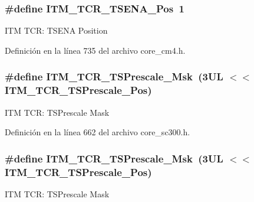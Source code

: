 \subsubsection[{\texorpdfstring{I\+T\+M\+\_\+\+T\+C\+R\+\_\+\+T\+S\+E\+N\+A\+\_\+\+Pos}{ITM_TCR_TSENA_Pos}}]{\setlength{\rightskip}{0pt plus 5cm}\#define I\+T\+M\+\_\+\+T\+C\+R\+\_\+\+T\+S\+E\+N\+A\+\_\+\+Pos~1}\hypertarget{group___c_m_s_i_s___i_t_m_ga5aa381845f810114ab519b90753922a1}{}\label{group___c_m_s_i_s___i_t_m_ga5aa381845f810114ab519b90753922a1}
I\+TM T\+CR\+: T\+S\+E\+NA Position 

Definición en la línea 735 del archivo core\+\_\+cm4.\+h.

\subsubsection[{\texorpdfstring{I\+T\+M\+\_\+\+T\+C\+R\+\_\+\+T\+S\+Prescale\+\_\+\+Msk}{ITM_TCR_TSPrescale_Msk}}]{\setlength{\rightskip}{0pt plus 5cm}\#define I\+T\+M\+\_\+\+T\+C\+R\+\_\+\+T\+S\+Prescale\+\_\+\+Msk~(3\+U\+L $<$$<$ I\+T\+M\+\_\+\+T\+C\+R\+\_\+\+T\+S\+Prescale\+\_\+\+Pos)}\hypertarget{group___c_m_s_i_s___i_t_m_ga7a723f71bfb0204c264d8dbe8cc7ae52}{}\label{group___c_m_s_i_s___i_t_m_ga7a723f71bfb0204c264d8dbe8cc7ae52}
I\+TM T\+CR\+: T\+S\+Prescale Mask 

Definición en la línea 662 del archivo core\+\_\+sc300.\+h.

\subsubsection[{\texorpdfstring{I\+T\+M\+\_\+\+T\+C\+R\+\_\+\+T\+S\+Prescale\+\_\+\+Msk}{ITM_TCR_TSPrescale_Msk}}]{\setlength{\rightskip}{0pt plus 5cm}\#define I\+T\+M\+\_\+\+T\+C\+R\+\_\+\+T\+S\+Prescale\+\_\+\+Msk~(3\+U\+L $<$$<$ I\+T\+M\+\_\+\+T\+C\+R\+\_\+\+T\+S\+Prescale\+\_\+\+Pos)}\hypertarget{group___c_m_s_i_s___i_t_m_ga7a723f71bfb0204c264d8dbe8cc7ae52}{}\label{group___c_m_s_i_s___i_t_m_ga7a723f71bfb0204c264d8dbe8cc7ae52}
I\+TM T\+CR\+: T\+S\+Prescale Mask 

